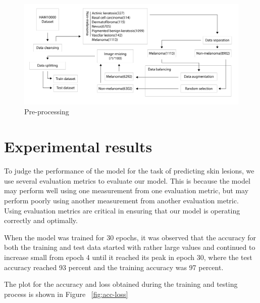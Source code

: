         \begin{figure}[htbp]
        \begin{center}
        \includegraphics[width=15cm]{./chapter-05-our-contribution/4.png}
        \end{center}
        \caption{Pre-processing}
        \label{fig:steps}
        \end{figure}



\section{Experimental results}
    To judge the performance of the model for the task of predicting skin lesions, we use several evaluation metrics to evaluate our model. This is because the model may perform well using one measurement from one evaluation metric, but may perform poorly using another measurement from another evaluation metric. Using evaluation metrics are critical in ensuring that our model is operating correctly and optimally.

    When the model was trained for 30 epochs, it was observed that the accuracy for both the training and test data started with rather large values and continued to increase small from epoch 4 until it reached its peak in epoch 30, where the test accuracy reached 93 percent and the training accuracy was 97 percent.

    The plot for the accuracy and loss obtained during the training and testing process is shown in Figure ~\ref{fig:acc-loss}

